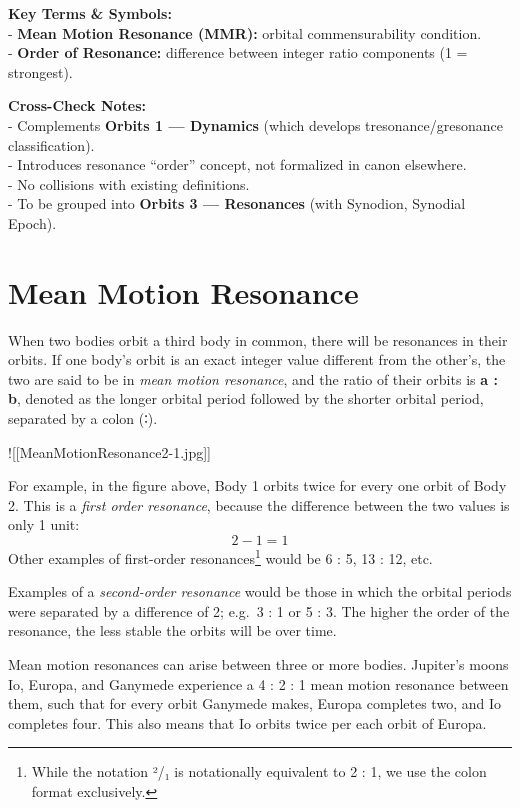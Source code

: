 \documentclass[
  letterpaper,
]{book}
\begin{document}
\textbf{Key Terms \& Symbols:}\\
- \textbf{Mean Motion Resonance (MMR):} orbital commensurability
condition.\\
- \textbf{Order of Resonance:} difference between integer ratio
components (1 = strongest).

\textbf{Cross-Check Notes:}\\
- Complements \textbf{Orbits 1 --- Dynamics} (which develops
tresonance/gresonance classification).\\
- Introduces resonance ``order'' concept, not formalized in canon
elsewhere.\\
- No collisions with existing definitions.\\
- To be grouped into \textbf{Orbits 3 --- Resonances} (with Synodion,
Synodial Epoch).

\chapter{Mean Motion Resonance}\label{mean-motion-resonance}

When two bodies orbit a third body in common, there will be resonances
in their orbits. If one body's orbit is an exact integer value different
from the other's, the two are said to be in \emph{mean motion
resonance}, and the ratio of their orbits is \textbf{a : b}, denoted as
the longer orbital period followed by the shorter orbital period,
separated by a colon (∶).

!{[}{[}MeanMotionResonance2-1.jpg{]}{]}

For example, in the figure above, Body 1 orbits twice for every one
orbit of Body 2. This is a \emph{first order resonance}, because the
difference between the two values is only 1 unit: \[
2 - 1 = 1
\] Other examples of first-order resonances\footnote{While the notation
  ²/₁ is notationally equivalent to 2 : 1, we use the colon format
  exclusively.} would be 6 : 5, 13 : 12, etc.

Examples of a \emph{second-order resonance} would be those in which the
orbital periods were separated by a difference of 2; e.g.~3 : 1 or 5 :
3. The higher the order of the resonance, the less stable the orbits
will be over time.

Mean motion resonances can arise between three or more bodies. Jupiter's
moons Io, Europa, and Ganymede experience a 4 : 2 : 1 mean motion
resonance between them, such that for every orbit Ganymede makes, Europa
completes two, and Io completes four. This also means that Io orbits
twice per each orbit of Europa.
\end{document}
